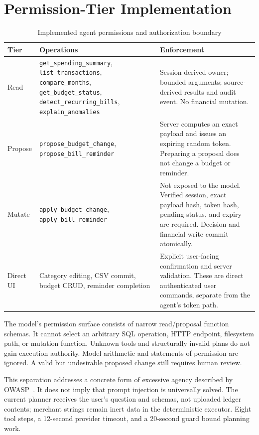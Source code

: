 \documentclass[conference,a4paper]{IEEEtran}
\begin{document}
\section{Permission-Tier Implementation}
\begin{table}[t]
\caption{Implemented agent permissions and authorization boundary}
\centering\small
\begin{tabular}{L{18mm}L{83mm}L{65mm}}
\toprule Tier & Operations & Enforcement\\\midrule
Read & \texttt{get\_spending\_summary}, \texttt{list\_transactions}, \texttt{compare\_months}, \texttt{get\_budget\_status}, \texttt{detect\_recurring\_bills}, \texttt{explain\_anomalies} & Session-derived owner; bounded arguments; source-derived results and audit event. No financial mutation.\\
Propose & \texttt{propose\_budget\_change}, \texttt{propose\_bill\_reminder} & Server computes an exact payload and issues an expiring random token. Preparing a proposal does not change a budget or reminder.\\
Mutate & \texttt{apply\_budget\_change}, \texttt{apply\_bill\_reminder} & Not exposed to the model. Verified session, exact payload hash, token hash, pending status, and expiry are required. Decision and financial write commit atomically.\\
Direct UI & Category editing, CSV commit, budget CRUD, reminder completion & Explicit user-facing confirmation and server validation. These are direct authenticated user commands, separate from the agent's token path.\\
\bottomrule
\end{tabular}
\end{table}

The model's permission surface consists of narrow read/proposal function schemas. It cannot select an arbitrary SQL operation, HTTP endpoint, filesystem path, or mutation function. Unknown tools and structurally invalid plans do not gain execution authority. Model arithmetic and statements of permission are ignored. A valid but undesirable proposed change still requires human review.

This separation addresses a concrete form of excessive agency described by OWASP~\cite{owaspagency}. It does not imply that prompt injection is universally solved. The current planner receives the user's question and schemas, not uploaded ledger contents; merchant strings remain inert data in the deterministic executor. Eight tool steps, a 12-second provider timeout, and a 20-second guard bound planning work.
\end{document}
